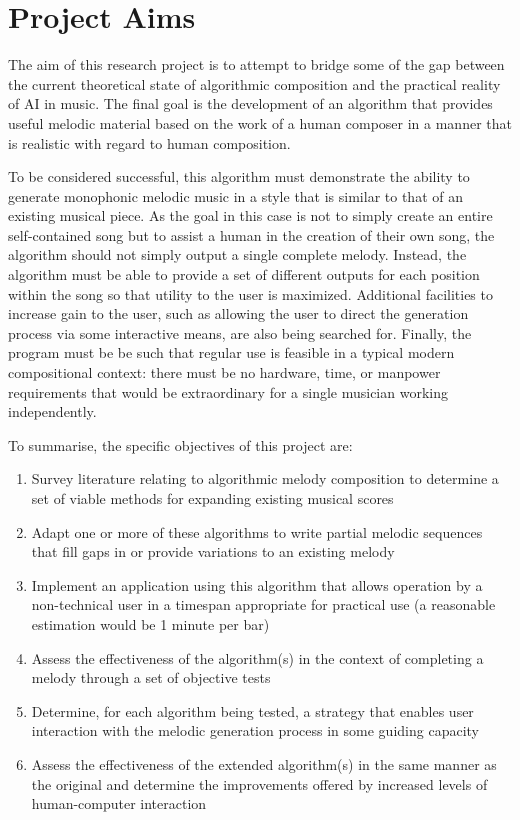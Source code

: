 \documentclass[ author={Stephen Livermore-Tozer},
				supervisor={Dr. Peter Flach},
				degree={MEng},
				title={Performing Algorithmic Co-composition Using Machine Learning},
				subtitle={},
				type={research},
				year={2016} ]{dissertation}
\begin{document}
	\section{Project Aims}
	
	The aim of this research project is to attempt to bridge some of the gap between the current theoretical state of algorithmic composition and the practical reality of AI in music. The final goal is the development of an algorithm that provides useful melodic material based on the work of a human composer in a manner that is realistic with regard to human composition.
	
	To be considered successful, this algorithm must demonstrate the ability to generate monophonic melodic music in a style that is similar to that of an existing musical piece. As the goal in this case is not to simply create an entire self-contained song but to assist a human in the creation of their own song, the algorithm should not simply output a single complete melody. Instead, the algorithm must be able to provide a set of different outputs for each position within the song so that utility to the user is maximized. Additional facilities to increase gain to the user, such as allowing the user to direct the generation process via some interactive means, are also being searched for. Finally, the program must be be such that regular use is feasible in a typical modern compositional context: there must be no hardware, time, or manpower requirements that would be extraordinary for a single musician working independently.
	
	To summarise, the specific objectives of this project are:
	\begin{enumerate}
		\item Survey literature relating to algorithmic melody composition to determine a set of viable methods for expanding existing musical scores
		\item Adapt one or more of these algorithms to write partial melodic sequences that fill gaps in or provide variations to an existing melody
		\item Implement an application using this algorithm that allows operation by a non-technical user in a timespan appropriate for practical use (a reasonable estimation would be 1 minute per bar)
		\item Assess the effectiveness of the algorithm(s) in the context of completing a melody through a set of objective tests
		\item Determine, for each algorithm being tested, a strategy that enables user interaction with the melodic generation process in some guiding capacity
		\item Assess the effectiveness of the extended algorithm(s) in the same manner as the original and determine the improvements offered by increased levels of human-computer interaction
	\end{enumerate}
	
\end{document}
